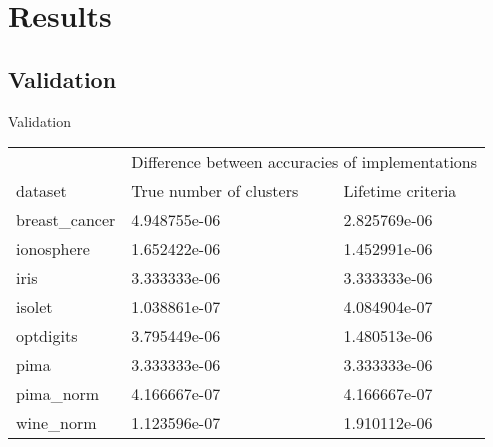

\section{Results}


\subsection{Validation}

\begin{frame}{Validation}


\centering
\scriptsize

\begin{tabular}{lll}
\toprule
         &        \multicolumn{2}{c}{Difference between accuracies of implementations} \\
dataset &      True number of clusters & Lifetime criteria \\
\midrule
breast\_cancer &  4.948755e-06 &      2.825769e-06 \\
ionosphere    &  1.652422e-06 &      1.452991e-06 \\
iris          &  3.333333e-06 &      3.333333e-06 \\
isolet        &  1.038861e-07 &      4.084904e-07 \\
optdigits     &  3.795449e-06 &      1.480513e-06 \\
pima          &  3.333333e-06 &      3.333333e-06 \\
pima\_norm     &  4.166667e-07 &      4.166667e-07 \\
wine\_norm     &  1.123596e-07 &      1.910112e-06 \\
\bottomrule
\end{tabular}


\end{frame}

